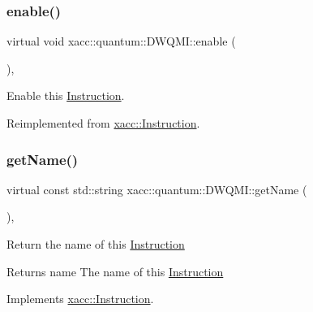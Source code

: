 \mbox{\label{a01225_ae4f563cead75aaa43f06db83e90ee855}} 
\subsubsection{\texorpdfstring{enable()}{enable()}}
{\footnotesize\ttfamily virtual void xacc\+::quantum\+::\+D\+W\+Q\+M\+I\+::enable (\begin{DoxyParamCaption}{ }\end{DoxyParamCaption})\hspace{0.3cm}{\ttfamily [inline]}, {\ttfamily [virtual]}}

Enable this \hyperlink{a01657}{Instruction}. 

Reimplemented from \hyperlink{a01657_a0b4f2e5a591af28342a3c08e4305e24f}{xacc\+::\+Instruction}.

\mbox{\label{a01225_ad93428eb61adade7bb99c7633bb02aca}} 
\subsubsection{\texorpdfstring{get\+Name()}{getName()}}
{\footnotesize\ttfamily virtual const std\+::string xacc\+::quantum\+::\+D\+W\+Q\+M\+I\+::get\+Name (\begin{DoxyParamCaption}{ }\end{DoxyParamCaption})\hspace{0.3cm}{\ttfamily [inline]}, {\ttfamily [virtual]}}

Return the name of this \hyperlink{a01657}{Instruction}

\begin{DoxyReturn}{Returns}
name The name of this \hyperlink{a01657}{Instruction} 
\end{DoxyReturn}


Implements \hyperlink{a01657_ac7ff23f693e2276edbf3fdac5452792c}{xacc\+::\+Instruction}.

\mbox{\label{a01225_aa15882df55d3f0af3a2ec9d72a2db4c0}} 
